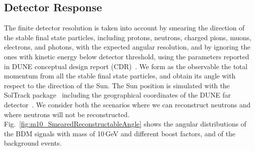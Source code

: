 
\subsection{Detector Response}
\label{sec:detector_resp}

The finite detector resolution is taken into
account by smearing the direction of the stable final state particles, 
including protons, neutrons, charged pions, muons, electrons, and photons,
with the expected angular resolution,
and by ignoring the ones with kinetic energy below detector threshold,
using the parameters reported in DUNE conceptual design report (CDR)~\cite{DUNE_CDR_V2}.
We form as the observable the total momentum from all the stable final state particles,
and obtain its angle with respect to the direction of the Sun.
The Sun position is simulated with the SolTrack package~\cite{SolTrack}
including the geographical coordinates of the DUNE far detector~\cite{DUNE_DocDB136}.
We consider both the scenarios where we can reconstruct neutrons and where
neutrons will not be reconstructed.
Fig.~\ref{fig:m10_SmearedReconstructableAngle} shows the angular distributions of
the BDM signals with mass of 10\,GeV and different boost factors,
and of the background events.

